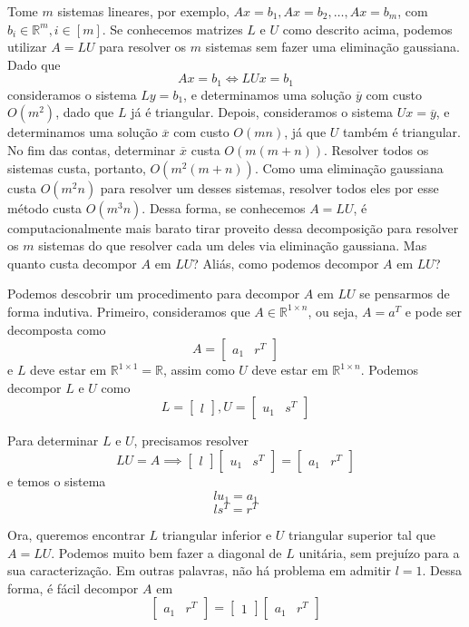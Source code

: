 \documentclass[]{article}
\numberwithin{equation}{section}
\begin{document}
Tome $m$ sistemas lineares, por exemplo, $Ax = b_1, Ax = b_2, \dots, Ax = b_m$, com $b_i \in \mathbb{R}^m, i \in [m]$. Se conhecemos matrizes $L$ e $U$ como descrito acima, podemos utilizar $A = LU$ para resolver os $m$ sistemas sem fazer uma eliminação gaussiana. Dado que
$$
Ax = b_1 \iff LUx = b_1
$$
consideramos o sistema $Ly = b_1$, e determinamos uma solução $\overline{y}$ com custo $O(m^2)$, dado que $L$ já é triangular. Depois, consideramos o sistema $Ux = \overline{y}$, e determinamos uma solução $\overline{x}$ com custo $O(mn)$, já que $U$ também é triangular. No fim das contas, determinar $\overline{x}$ custa $O(m(m + n))$. Resolver todos os sistemas custa, portanto, $O(m^2(m + n))$. Como uma eliminação gaussiana custa $O(m^2n)$ para resolver um desses sistemas, resolver todos eles por esse método custa $O(m^3n)$. Dessa forma, se conhecemos $A = LU$, é computacionalmente mais barato tirar proveito dessa decomposição para resolver os $m$ sistemas do que resolver cada um deles via eliminação gaussiana. Mas quanto custa decompor $A$ em $LU$? Aliás, como podemos decompor $A$ em $LU$?

Podemos descobrir um procedimento para decompor $A$ em $LU$ se pensarmos de forma indutiva. Primeiro, consideramos que $A \in \mathbb{R}^{1 \times n}$, ou seja, $A = a^T$ e pode ser decomposta como
$$
A =
\begin{bmatrix}
a_1 & r^T
\end{bmatrix}
$$
e $L$ deve estar em $\mathbb{R}^{1 \times 1} = \mathbb{R}$, assim como $U$ deve estar em $\mathbb{R}^{1 \times n}$. Podemos decompor $L$ e $U$ como
$$
L =
\begin{bmatrix}
l
\end{bmatrix}
,
U =
\begin{bmatrix}
u_1 & s^T
\end{bmatrix}
$$

Para determinar $L$ e $U$, precisamos resolver
$$
LU = A \implies
\begin{bmatrix}
l
\end{bmatrix}
\begin{bmatrix}
u_1 & s^T
\end{bmatrix}
=
\begin{bmatrix}
a_1 & r^T
\end{bmatrix}
$$
e temos o sistema
$$
lu_1 = a_1
$$
$$
ls^T = r^T
$$

Ora, queremos encontrar $L$ triangular inferior e $U$ triangular superior tal que $A = LU$. Podemos muito bem fazer a diagonal de $L$ unitária, sem prejuízo para a sua caracterização. Em outras palavras, não há problema em admitir $l = 1$. Dessa forma, é fácil decompor $A$ em
$$
\begin{bmatrix}
a_1 & r^T
\end{bmatrix}
=
\begin{bmatrix}
1
\end{bmatrix}
\begin{bmatrix}
a_1 & r^T
\end{bmatrix}
$$
\end{document}
